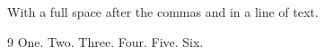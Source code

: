 \documentclass{article}
\begin{document}
With a full space after the commas \cite{a,c,e} and \cite{b,a,f,e,d} in a line of text.

\begin{thebibliography}{9}
 One.
 Two.
 Three.
 Four.
 Five.
 Six.
\end{thebibliography}
\end{document}
